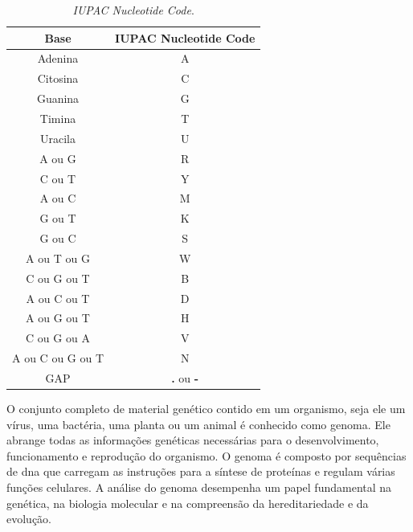 \begin{table}[htb]
  \caption{\textit{IUPAC Nucleotide Code}.}
  \begin{center}
    \begin{tabular}{|c|c|}
      \hline
      Base             & IUPAC Nucleotide Code    \\
      \hline
      Adenina          & A                        \\
      Citosina         & C                        \\
      Guanina          & G                        \\
      Timina           & T                        \\
      Uracila          & U                        \\
      A ou G           & R                        \\
      C ou T           & Y                        \\
      A ou C           & M                        \\
      G ou T           & K                        \\
      G ou C           & S                        \\
      A ou T ou G      & W                        \\
      C ou G ou T      & B                        \\
      A ou C ou T      & D                        \\
      A ou G ou T      & H                        \\
      C ou G ou A      & V                        \\
      A ou C ou G ou T & N                        \\
      GAP              & \textbf{.} ou \textbf{-} \\
      \hline
    \end{tabular}
  \end{center}
  \label{tab:iupacNucleotideCode}
\end{table}

O conjunto completo de material genético contido em um organismo, seja ele um vírus, uma bactéria, uma planta ou um animal é conhecido como genoma. Ele abrange todas as informações genéticas necessárias para o desenvolvimento, funcionamento e reprodução do organismo. O genoma é composto por sequências de \gls{dna} que carregam as instruções para a síntese de proteínas e regulam várias funções celulares. A análise do genoma desempenha um papel fundamental na genética, na biologia molecular e na compreensão da hereditariedade e da evolução.~\cite{alberts_biologia_2017}

